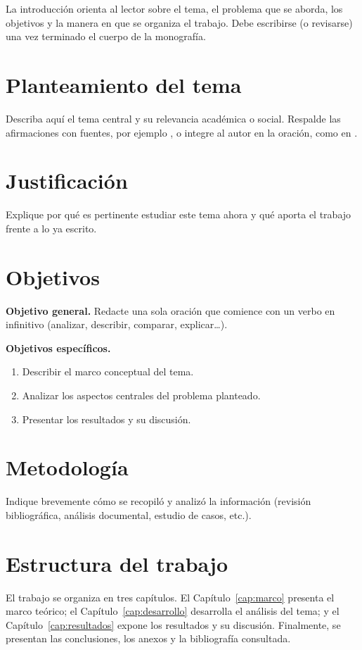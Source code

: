 
La introducción orienta al lector sobre el tema, el problema que se aborda, los
objetivos y la manera en que se organiza el trabajo. Debe escribirse (o
revisarse) una vez terminado el cuerpo de la monografía.

\section*{Planteamiento del tema}

Describa aquí el tema central y su relevancia académica o social. Respalde las
afirmaciones con fuentes, por ejemplo \citep{eco2001tesis}, o integre al autor
en la oración, como en \citet{hernandez2014metodologia}.

\section*{Justificación}

Explique por qué es pertinente estudiar este tema ahora y qué aporta el trabajo
frente a lo ya escrito.

\section*{Objetivos}

\textbf{Objetivo general.} Redacte una sola oración que comience con un verbo en
infinitivo (analizar, describir, comparar, explicar\ldots).

\textbf{Objetivos específicos.}
\begin{enumerate}[label=\arabic*.]
  \item Describir el marco conceptual del tema.
  \item Analizar los aspectos centrales del problema planteado.
  \item Presentar los resultados y su discusión.
\end{enumerate}

\section*{Metodología}

Indique brevemente cómo se recopiló y analizó la información (revisión
bibliográfica, análisis documental, estudio de casos, etc.).

\section*{Estructura del trabajo}

El trabajo se organiza en tres capítulos. El Capítulo~\ref{cap:marco} presenta
el marco teórico; el Capítulo~\ref{cap:desarrollo} desarrolla el análisis del
tema; y el Capítulo~\ref{cap:resultados} expone los resultados y su discusión.
Finalmente, se presentan las conclusiones, los anexos y la bibliografía
consultada.
